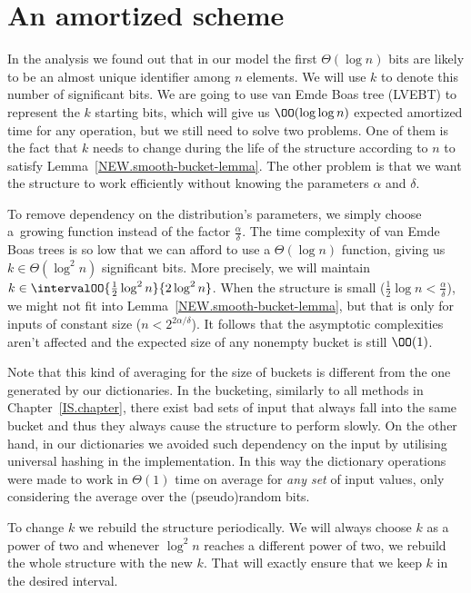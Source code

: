 
\section{An amortized scheme} \label{NEW.amortized-scheme}
In the analysis we found out that in our model the first $\Theta(\log n)$ bits are likely to be an almost unique identifier among $n$ elements. We will use $k$ to denote this number of significant bits.
We are going to use van Emde Boas tree (LVEBT) to represent the $k$ starting bits, which will give us $\OO(\log\log n)$ expected amortized time for any operation, but we still need to solve two problems.
One of them is the fact that $k$ needs to change during the life of the structure according to $n$ to satisfy Lemma~\ref{NEW.smooth-bucket-lemma}. The other problem is that we want the structure to work efficiently without knowing the parameters $\alpha$ and $\delta$.

\def\Half{\frac 1 2}

To remove dependency on the distribution's parameters, we simply choose a~growing function instead of the factor $\frac \alpha \delta$.
The time complexity of van Emde Boas trees is so low that we can afford to use a $\Theta(\log n)$ function, giving us $k \in \Theta(\log^2 n)$ significant bits.
More precisely, we will maintain $k \in \intervalOO{\Half \log^2 n}{2 \log^2 n}$.
When the structure is small ($\Half \log n < \frac \alpha \delta$), we might not fit into Lemma~\ref{NEW.smooth-bucket-lemma}, but that is only for inputs of constant size ($n < 2^{2 \alpha / \delta}$). It follows that the asymptotic complexities aren't affected and the expected size of any nonempty bucket is still $\OO(1)$.

Note that this kind of averaging for the size of buckets is different from the one generated by our dictionaries. In the bucketing, similarly to all methods in Chapter~\ref{IS.chapter}, there exist bad sets of input that always fall into the same bucket and thus they always cause the structure to perform slowly.
On the other hand, in our dictionaries we avoided such dependency on the input by utilising universal hashing in the implementation. In this way the dictionary operations were made to work in $\Theta(1)$ time on average for \emph{any set} of input values, only considering the average over the (pseudo)random bits.

To change $k$ we rebuild the structure periodically. We will always choose $k$ as a power of two and whenever $\log^2 n$ reaches a different power of two, we rebuild the whole structure with the new $k$. That will exactly ensure that we keep $k$ in the desired interval.

